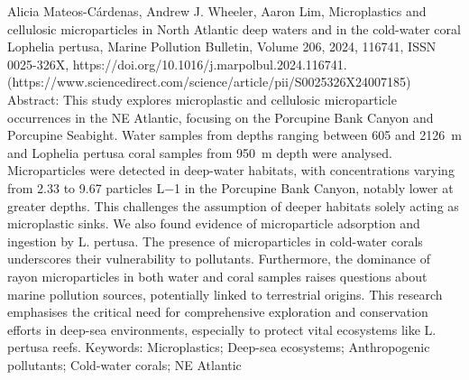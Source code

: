 \documentclass[twocolumn,a4paper,aps,amsmath,amssymb,floatfix,superscriptaddress]{revtex4-2}
\begin{document}
\begin{thebibliography}{10}
		Alicia Mateos-Cárdenas, Andrew J. Wheeler, Aaron Lim,
		Microplastics and cellulosic microparticles in North Atlantic deep waters and in the cold-water coral Lophelia pertusa,
		Marine Pollution Bulletin,
		Volume 206,
		2024,
		116741,
		ISSN 0025-326X,
		https://doi.org/10.1016/j.marpolbul.2024.116741.
		(https://www.sciencedirect.com/science/article/pii/S0025326X24007185)
		Abstract: This study explores microplastic and cellulosic microparticle occurrences in the NE Atlantic, focusing on the Porcupine Bank Canyon and Porcupine Seabight. Water samples from depths ranging between 605 and 2126 m and Lophelia pertusa coral samples from 950 m depth were analysed. Microparticles were detected in deep-water habitats, with concentrations varying from 2.33 to 9.67 particles L−1 in the Porcupine Bank Canyon, notably lower at greater depths. This challenges the assumption of deeper habitats solely acting as microplastic sinks. We also found evidence of microparticle adsorption and ingestion by L. pertusa. The presence of microparticles in cold-water corals underscores their vulnerability to pollutants. Furthermore, the dominance of rayon microparticles in both water and coral samples raises questions about marine pollution sources, potentially linked to terrestrial origins. This research emphasises the critical need for comprehensive exploration and conservation efforts in deep-sea environments, especially to protect vital ecosystems like L. pertusa reefs.
		Keywords: Microplastics; Deep-sea ecosystems; Anthropogenic pollutants; Cold-water corals; NE Atlantic
		

\end{thebibliography}
\end{document}
